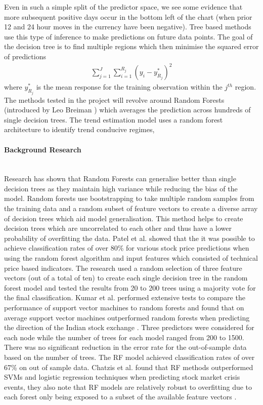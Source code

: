 \documentclass[11pt]{article}
\newcommand{\myparagraph}[1]{\paragraph{#1}\mbox{}\\}
\begin{document}
Even in such a simple split of the predictor space, we see some evidence that more subsequent positive days occur in the bottom left of the chart (when prior 12 and 24 hour moves in the currency have been negative). Tree based methods use this type of inference to make predictions on future data points. The goal of the decision tree is to find multiple regions which then minimise the squared error of predictions
\begin{align}
\sum^{J}_{j = 1}\sum^{R_{j}}_{i = 1} (y_{i}-y^{*}_{R_{j}})^{2} 
\end{align}
 where $y^{*}_{R_{j}}$ is the mean response for the training observation within the $j^{th}$ region.
The methods tested in the project will revolve around Random Forests (introduced by Leo Breiman \cite{Breiman2001}) which averages the prediction across hundreds of single decision trees. The trend estimation model uses a random forest architecture to identify trend conducive regimes,
\myparagraph{Background Research}
Research has shown that Random Forests can generalise better than single decision trees as they maintain high variance while reducing the bias of the model\cite{Genuer2012}.
 Random forests use bootstrapping to take multiple random samples from the training data and a random subset of feature vectors to create a diverse array of decision trees which aid model generalisation. This method helps to create decision trees which are uncorrelated to each other and thus have a lower probability of overfitting the data. Patel et al. showed that the it was possible to achieve classification rates of over 80\% for various stock price predictions when using the random forest algorithm and input features which consisted of technical price based indicators\cite{Patel2015}. The research used a random selection of three feature vectors (out of a total of ten) to create each single decision tree in the random forest model and tested the results from 20 to 200 trees using a majority vote for the final classification.  \newline
Kumar et al. performed extensive tests to compare the performance of support vector machines to random forests and found that on average support vector machines outperformed random forests when predicting the direction of the Indian stock exchange \cite{Kumar2006}. Three predictors were considered for each node while the number of trees for each model ranged from 200 to 1500. There was no significant reduction in the error rate for the out-of-sample data based on the number of trees. The RF model achieved classification rates of over 67\% on out of sample data.\newline
Chatzis et al. found that RF methods outperformed SVMs and logistic regression techniques when predicting stock market crisis events, they also note that RF models are relatively robust to overfitting due to each forest only being exposed to a subset of the available feature vectors \cite{Chatzis2018}.
 
\end{document}

